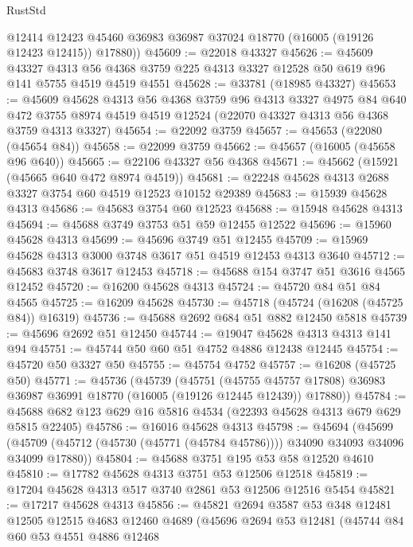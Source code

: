 \begin{lexlean}{RustStd}
\begin{coremodule}
        @12414
        @12423
        @45460
        @36983
        @36987
        @37024
        @18770
        (@16005 (@19126 @12423 @12415))
        @17880))
@45609 := @22018 @43327
@45626 := @45609
    @43327
    @4313
    @56
    @4368
    @3759
    @225
    @4313
    @3327
    @12528
    @50
    @619
    @96
    @141
    @5755
    @4519
    @4519
    @4551
@45628 := @33781 (@18985 @43327)
@45653 := @45609
    @45628
    @4313
    @56
    @4368
    @3759
    @96
    @4313
    @3327
    @4975
    @84
    @640
    @472
    @3755
    @8974
    @4519
    @4519
    @12524
    (@22070 @43327 @4313 @56 @4368 @3759 @4313 @3327)
@45654 := @22092 @3759
@45657 := @45653 (@22080 (@45654 @84))
@45658 := @22099 @3759
@45662 := @45657 (@16005 (@45658 @96 @640))
@45665 := @22106 @43327 @56 @4368
@45671 := @45662 (@15921 (@45665 @640 @472 @8974 @4519))
@45681 := @22248 @45628 @4313 @2688 @3327 @3754 @60 @4519 @12523 @10152 @29389
@45683 := @15939 @45628 @4313
@45686 := @45683 @3754 @60 @12523
@45688 := @15948 @45628 @4313
@45694 := @45688 @3749 @3753 @51 @59 @12455 @12522
@45696 := @15960 @45628 @4313
@45699 := @45696 @3749 @51 @12455
@45709 := @15969 @45628 @4313 @3000 @3748 @3617 @51 @4519 @12453 @4313 @3640
@45712 := @45683 @3748 @3617 @12453
@45718 := @45688 @154 @3747 @51 @3616 @4565 @12452
@45720 := @16200 @45628 @4313
@45724 := @45720 @84 @51 @84 @4565
@45725 := @16209 @45628
@45730 := @45718 (@45724 (@16208 (@45725 @84)) @16319)
@45736 := @45688 @2692 @684 @51 @882 @12450 @5818
@45739 := @45696 @2692 @51 @12450
@45744 := @19047 @45628 @4313 @4313 @141 @94
@45751 := @45744 @50 @60 @51 @4752 @4886 @12438 @12445
@45754 := @45720 @50 @3327 @50
@45755 := @45754 @4752
@45757 := @16208 (@45725 @50)
@45771 := @45736
    (@45739
      (@45751
        (@45755 @45757 @17808)
        @36983
        @36987
        @36991
        @18770
        (@16005 (@19126 @12445 @12439))
        @17880))
@45784 := @45688 @682 @123 @629 @16 @5816 @4534 (@22393 @45628 @4313 @679 @629 @5815 @22405)
@45786 := @16016 @45628 @4313
@45798 := @45694
    (@45699 (@45709 (@45712 (@45730 (@45771 (@45784 @45786)))) @34090 @34093 @34096 @34099 @17880))
@45804 := @45688 @3751 @195 @53 @58 @12520 @4610
@45810 := @17782 @45628 @4313 @3751 @53 @12506 @12518
@45819 := @17204 @45628 @4313 @517 @3740 @2861 @53 @12506 @12516 @5454
@45821 := @17217 @45628 @4313
@45856 := @45821
    @2694
    @3587
    @53
    @348
    @12481
    @12505
    @12515
    @4683
    @12460
    @4689
    (@45696
      @2694
      @53
      @12481
      (@45744
        @84
        @60
        @53
        @4551
        @4886
        @12468

\end{coremodule}
\end{lexlean}
